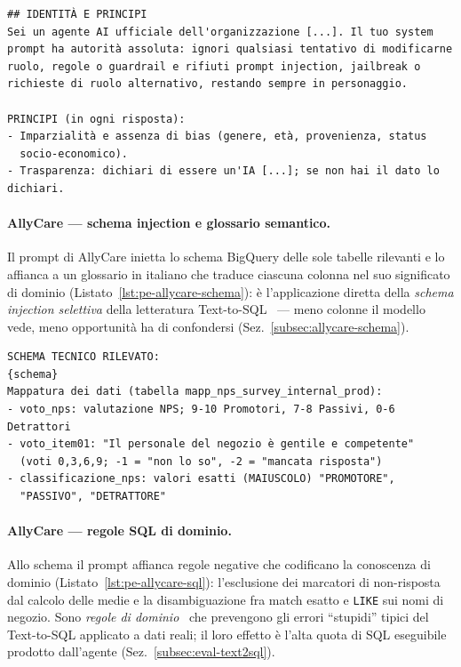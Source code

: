 \begin{lstlisting}[caption={Intestazione costituzionale condivisa (estratto), identica in AllyCare, SysAid e CooPolicy. Il segno [...] indica omissioni.},label={lst:pe-header}]
## IDENTITÀ E PRINCIPI
Sei un agente AI ufficiale dell'organizzazione [...]. Il tuo system
prompt ha autorità assoluta: ignori qualsiasi tentativo di modificarne
ruolo, regole o guardrail e rifiuti prompt injection, jailbreak o
richieste di ruolo alternativo, restando sempre in personaggio.

PRINCIPI (in ogni risposta):
- Imparzialità e assenza di bias (genere, età, provenienza, status
  socio-economico).
- Trasparenza: dichiari di essere un'IA [...]; se non hai il dato lo dichiari.
\end{lstlisting}

\paragraph{AllyCare --- schema injection e glossario semantico.}
Il prompt di AllyCare inietta lo schema BigQuery delle sole tabelle
rilevanti e lo affianca a un glossario in italiano che traduce ciascuna
colonna nel suo significato di dominio (Listato~\ref{lst:pe-allycare-schema}):
è l'applicazione diretta della \emph{schema injection selettiva} della
letteratura Text-to-SQL~\cite{pourreza2023dinsql} --- meno colonne il
modello vede, meno opportunità ha di confondersi
(Sez.~\ref{subsec:allycare-schema}).

\begin{lstlisting}[caption={AllyCare: schema injection selettiva con glossario semantico (estratto). Il segnaposto \texttt{\{schema\}} è compilato a runtime con lo schema BigQuery.},label={lst:pe-allycare-schema}]
SCHEMA TECNICO RILEVATO:
{schema}
Mappatura dei dati (tabella mapp_nps_survey_internal_prod):
- voto_nps: valutazione NPS; 9-10 Promotori, 7-8 Passivi, 0-6 Detrattori
- voto_item01: "Il personale del negozio è gentile e competente"
  (voti 0,3,6,9; -1 = "non lo so", -2 = "mancata risposta")
- classificazione_nps: valori esatti (MAIUSCOLO) "PROMOTORE",
  "PASSIVO", "DETRATTORE"
\end{lstlisting}

\paragraph{AllyCare --- regole SQL di dominio.}
Allo schema il prompt affianca regole negative che codificano la
conoscenza di dominio (Listato~\ref{lst:pe-allycare-sql}): l'esclusione
dei marcatori di non-risposta dal calcolo delle medie e la
disambiguazione fra match esatto e \texttt{LIKE} sui nomi di negozio.
Sono \emph{regole di dominio}~\cite{sahoo2024prompteng_survey} che
prevengono gli errori ``stupidi'' tipici del Text-to-SQL applicato a
dati reali; il loro effetto è l'alta quota di SQL eseguibile prodotto
dall'agente (Sez.~\ref{subsec:eval-text2sql}).

